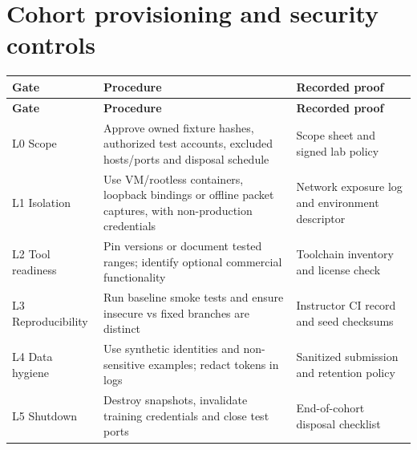 \documentclass[10pt,letterpaper]{article}
\begin{document}
\section{Cohort provisioning and security controls}
\begingroup\footnotesize\setlength\tabcolsep{3pt}
\begin{longtable}{>{\raggedright\arraybackslash}p{}>{\raggedright\arraybackslash}p{}>{\raggedright\arraybackslash}p{}}\toprule
\textbf{Gate} & \textbf{Procedure} & \textbf{Recorded proof}\\\midrule\endfirsthead
\toprule \textbf{Gate} & \textbf{Procedure} & \textbf{Recorded proof}\\\midrule\endhead
L0 Scope & Approve owned fixture hashes, authorized test accounts, excluded hosts/ports and disposal schedule & Scope sheet and signed lab policy\\\midrule
L1 Isolation & Use VM/rootless containers, loopback bindings or offline packet captures, with non-production credentials & Network exposure log and environment descriptor\\\midrule
L2 Tool readiness & Pin versions or document tested ranges; identify optional commercial functionality & Toolchain inventory and license check\\\midrule
L3 Reproducibility & Run baseline smoke tests and ensure insecure vs fixed branches are distinct & Instructor CI record and seed checksums\\\midrule
L4 Data hygiene & Use synthetic identities and non-sensitive examples; redact tokens in logs & Sanitized submission and retention policy\\\midrule
L5 Shutdown & Destroy snapshots, invalidate training credentials and close test ports & End-of-cohort disposal checklist\\\midrule
\bottomrule\end{longtable}\endgroup
\end{document}
